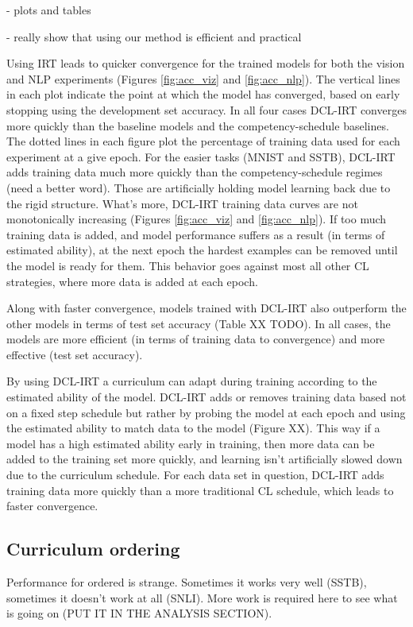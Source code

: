 \documentclass[letterpaper]{article} %
\begin{document}
- plots and tables 

- really show that using our method is efficient and practical 



Using IRT leads to quicker convergence for the trained models for both the vision and NLP experiments (Figures \ref{fig:acc_viz} and \ref{fig:acc_nlp}).
The vertical lines in each plot indicate the point at which the model has converged, based on early stopping using the development set accuracy.
In all four cases DCL-IRT converges more quickly than the baseline models and the competency-schedule baselines.
The dotted lines in each figure plot the percentage of training data used for each experiment at a give epoch.
For the easier tasks (MNIST and SSTB), DCL-IRT adds training data much more quickly than the competency-schedule regimes (need a better word).
Those are artificially holding model learning back due to the rigid structure.
What's more, DCL-IRT training data curves are not monotonically increasing (Figures \ref{fig:acc_viz} and \ref{fig:acc_nlp}).
If too much training data is added, and model performance suffers as a result (in terms of estimated ability), at the next epoch the hardest examples can be removed until the model is ready for them.
This behavior goes against most all other CL strategies, where more data is added at each epoch. 

Along with faster convergence, models trained with DCL-IRT also outperform the other models in terms of test set accuracy (Table XX TODO).
In all cases, the models are more efficient (in terms of training data to convergence) and more effective (test set accuracy).

By using DCL-IRT a curriculum can adapt during training according to the estimated ability of the model.
DCL-IRT adds or removes training data based not on a fixed step schedule but rather by probing the model at each epoch and using the estimated ability to match data to the model (Figure XX).
This way if a model has a high estimated ability early in training, then more data can be added to the training set more quickly, and learning isn't artificially slowed down due to the curriculum schedule.
For each data set in question, DCL-IRT adds training data more quickly than a more traditional CL schedule, which leads to faster convergence.

\subsection{Curriculum ordering}
Performance for ordered is strange.
Sometimes it works very well (SSTB), sometimes it doesn't work at all (SNLI).
More work is required here to see what is going on (PUT IT IN THE ANALYSIS SECTION).
\end{document}
